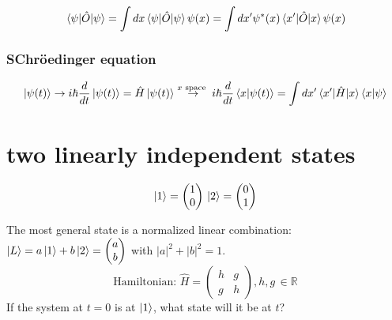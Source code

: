        $$\expval{\hat{O}}{\psi}= \int d x \expval{\hat{O}}{\psi} \psi(x)= \int d x^{\prime} \psi^{*}(x) \mel{x'}{\hat{O}}{x} \psi(x)$$

        \subsubsection{SChr\"oedinger equation}

        $$ \ket{\psi(t)}\rightarrow i \hbar \frac{d}{d t}\ket{\psi(t)}=\hat{H}\ket{\psi(t)}\stackrel{x \text { space }}{\rightarrow} i \hbar \frac{d}{d t}\bra{x} \ket{\psi(t)}=\int d x^{\prime} \mel{x'}{\hat{H}}{x} \bra{x} \ket{\psi}$$

\section{two linearly independent states}

$$\ket{1}=\begin{pmatrix}1\\0\end{pmatrix}\,\ket{2}=\begin{pmatrix}0\\1\end{pmatrix}$$

The most general state is a normalized linear combination: $\ket{L}=a\ket{1}+b\ket{2}=\begin{pmatrix}a\\b\end{pmatrix}$ with $|a|^2+|b|^2=1$.\\
\[\text{Hamiltonian: } \hat{H}=\begin{pmatrix}h&g\\g&h\end{pmatrix}, h,g\,\in \mathbb{R}\]
If the system at $t=0$ is at $\ket{1}$, what state will it be at $t$?

